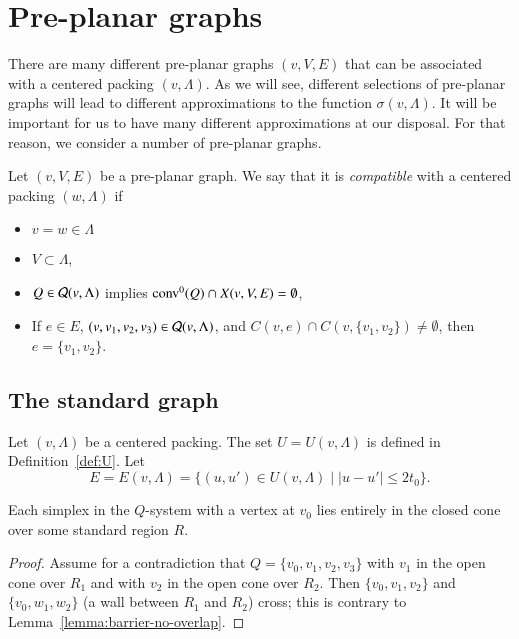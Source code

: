 \section{Pre-planar graphs}

There are many different pre-planar graphs $(v,V,E)$ that
can be associated with a centered packing $(v,\Lambda)$.
As we will see, different selections of pre-planar graphs
will lead to different approximations to the function $\sigma(v,\Lambda)$.
It will be important for us to have many different approximations
at our disposal.  For that reason, we consider a number of
pre-planar graphs.

\begin{definition}\label{def:compatible}
Let $(v,V,E)$ be a pre-planar graph.  We say that it is
{\it compatible} with a centered packing $(w,\Lambda)$ 
if 
\begin{itemize}
\item 
$v=w\in\Lambda$
\item
 $V\subset \Lambda$, 
\item  $Q\in {\mathcal Q}(v,\Lambda)$ implies
${\operatorname{conv}}^0(Q)\cap X(v,V,E)=\emptyset$,
\item  If $e\in E$, $(v,v_1,v_2,v_3)\in {\mathcal Q}(v,\Lambda)$,
and $C(v,e)\cap C(v,\{v_1,v_2\})\ne \emptyset$, then
   $e = \{v_1,v_2\}$.
\end{itemize}
\end{definition}

\subsection{The standard graph}

Let $(v,\Lambda)$ be a centered packing.  The set $U=U(v,\Lambda)$
is defined in Definition~\ref{def:U}.  
Let 
$$E = E(v,\Lambda) = \{(u,u')\in U(v,\Lambda) \mid |u-u'|\le 2t_0\}.
$$

\begin{lemma}
\label{lemma:Q-in-region} Each simplex in the $Q$-system with a
vertex at $v_0$ lies entirely in the closed cone over some
standard region $R$.
\end{lemma}

\begin{proof}  Assume for a contradiction that $Q=\{v_0,v_1,v_2,v_3\}$
with $v_1$ in the open cone over $R_1$ and with $v_2$ in the open
cone over $R_2$.  Then $\{v_0,v_1,v_2\}$ and $\{v_0,w_1,w_2\}$ (a wall
between $R_1$ and $R_2$) cross;  this is contrary to
Lemma~\ref{lemma:barrier-no-overlap}.
\end{proof}

